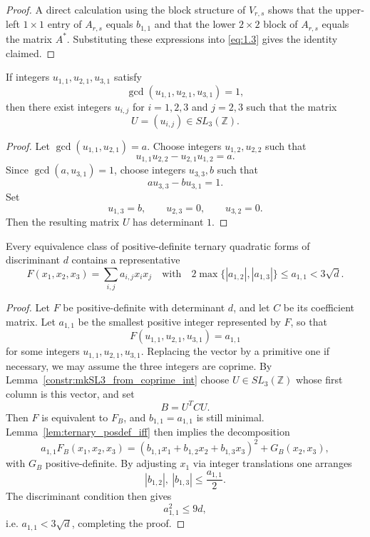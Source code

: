 \medskip

\begin{proof}
\leanok
{}
A direct calculation using the block structure of $V_{r,s}$ shows that the
upper‐left $1\times 1$ entry of $A_{r,s}$ equals $b_{1,1}$ and that the lower
$2\times 2$ block of $A_{r,s}$ equals the matrix $A^*$.  
Substituting these expressions into \eqref{eq:1.3} gives the identity claimed.
\end{proof}

\bigskip

\begin{construction}
\label{constr:mkSL3_from_coprime_int}
\leanok
If integers $u_{1,1},u_{2,1},u_{3,1}$ satisfy
\[
\gcd(u_{1,1},u_{2,1},u_{3,1}) = 1,
\]
then there exist integers $u_{i,j}$ for $i=1,2,3$ and $j=2,3$ such that the matrix
\[
U = (u_{i,j}) \in SL_3(\mathbb{Z}).
\]
\end{construction}

\begin{proof}
\leanok
Let $\gcd(u_{1,1},u_{2,1}) = a$.  Choose integers $u_{1,2},u_{2,2}$ such that
\[
u_{1,1}u_{2,2} - u_{2,1}u_{1,2} = a.
\]
Since $\gcd(a,u_{3,1}) = 1$, choose integers $u_{3,3}, b$ such that
\[
a u_{3,3} - b u_{3,1} = 1.
\]
Set
\[
u_{1,3} = b,\qquad
u_{2,3} = 0,\qquad
u_{3,2} = 0.
\]
Then the resulting matrix $U$ has determinant $1$.
\end{proof}


\begin{lemma}
\label{lem:ternary_lemma6}
\leanok
Every equivalence class of positive-definite ternary quadratic forms of discriminant $d$ contains a representative
\[
F(x_1,x_2,x_3) = \sum_{i,j} a_{i,j} x_i x_j
\quad\text{with}\quad
2 \max\{|a_{1,2}|, |a_{1,3}|\} \le a_{1,1} < 3\sqrt{d}.
\]
\end{lemma}

\begin{proof}
\leanok
{}
Let $F$ be positive-definite with determinant $d$, and let $C$ be its coefficient
matrix. Let $a_{1,1}$ be the smallest positive integer represented by $F$, so that
\[
F(u_{1,1}, u_{2,1}, u_{3,1}) = a_{1,1}
\]
for some integers $u_{1,1},u_{2,1},u_{3,1}$.  
Replacing the vector by a primitive one if necessary, we may assume the
three integers are coprime.  
By Lemma~\ref{constr:mkSL3_from_coprime_int} choose $U \in SL_3(\mathbb{Z})$ whose first column is this
vector, and set
\[
B = U^T C U.
\]
Then $F$ is equivalent to $F_B$, and $b_{1,1} = a_{1,1}$ is still minimal.
Lemma~\ref{lem:ternary_posdef_iff} then implies the decomposition
\[
a_{1,1} F_B(x_1,x_2,x_3)
= (b_{1,1} x_1 + b_{1,2}x_2 + b_{1,3}x_3)^2 + G_B(x_2,x_3),
\]
with $G_B$ positive-definite.  
By adjusting $x_1$ via integer translations one arranges
\[
|b_{1,2}|,\ |b_{1,3}| \le \frac{a_{1,1}}{2}.
\]
The discriminant condition then gives
\[
a_{1,1}^2 \le 9 d,
\]
i.e. $a_{1,1} < 3\sqrt{d}$, completing the proof.
\end{proof}

